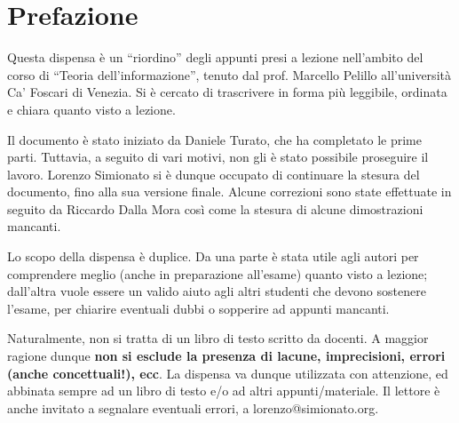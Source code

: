 \chapter*{Prefazione}
Questa dispensa è un ``riordino'' degli appunti presi a lezione nell'ambito del corso di ``Teoria dell'informazione'', tenuto dal prof. Marcello Pelillo all'università Ca' Foscari di Venezia. Si è cercato di trascrivere in forma più leggibile, ordinata e chiara quanto visto a lezione.
 
Il documento è stato iniziato da Daniele Turato, che ha completato le prime parti. Tuttavia, a seguito di vari motivi, non gli è stato possibile proseguire il lavoro. Lorenzo Simionato si è dunque occupato di continuare la stesura del documento, fino alla sua versione finale. Alcune correzioni sono state 
effettuate in seguito da Riccardo Dalla Mora così come la stesura di alcune dimostrazioni mancanti. 

Lo scopo della dispensa è duplice. Da una parte è stata utile agli autori per comprendere meglio (anche in preparazione all'esame) quanto visto a lezione; dall'altra vuole essere un valido aiuto agli altri studenti che devono sostenere l'esame, per chiarire eventuali dubbi o sopperire ad appunti mancanti.

Naturalmente, non si tratta di un libro di testo scritto da docenti. A maggior ragione dunque \textbf{non si esclude la presenza di lacune, imprecisioni, errori (anche concettuali!), ecc}. La dispensa va dunque utilizzata con attenzione, ed abbinata sempre 
ad un libro di testo e/o ad altri appunti/materiale.
Il lettore è anche invitato a segnalare eventuali errori, a lorenzo@simionato.org.
